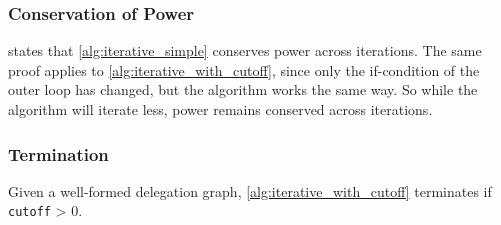 \subsubsection{Conservation of Power}

 states that \cref{alg:iterative_simple} conserves power across iterations. The same proof applies to \cref{alg:iterative_with_cutoff}, since only the if-condition of the outer loop has changed, but the algorithm works the same way. So while the algorithm will iterate less, power remains conserved across iterations.

\subsubsection{Termination}

\begin{lemma}\label{lem:iterative_alg_power_concentrates}
Given a well-formed delegation graph, \cref{alg:iterative_with_cutoff} terminates if \texttt{cutoff} > 0.
\end{lemma}


